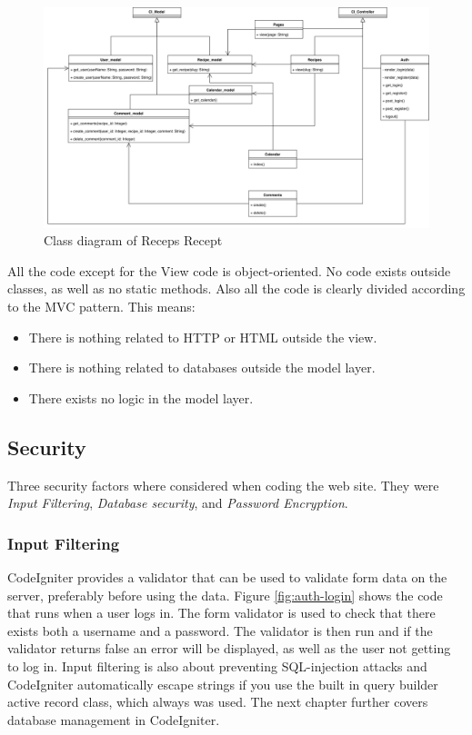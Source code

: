 \documentclass[a4paper]{scrartcl}
\begin{document}
\begin{figure}
	\begin{center}
		\includegraphics[width=\linewidth]{images/class-diagram.jpg}
		\caption{Class diagram of Receps Recept}
		\label{fig:class-diagram}
	\end{center}
\end{figure}

All the code except for the View code is object-oriented. No code exists outside classes, as well as no static methods. Also all the code is clearly divided according to the MVC pattern. This means:
\begin{itemize}
	\item There is nothing related to HTTP or HTML outside the view.
	\item There is nothing related to databases outside the model layer.
	\item There exists no logic in the model layer.
\end{itemize}

\subsection{Security}
Three security factors where considered when coding the web site. They were \textit{Input Filtering}, \textit{Database security}, and \textit{Password Encryption}.

\subsubsection{Input Filtering}
CodeIgniter provides a validator that can be used to validate form data on the server, preferably before using the data. Figure \ref{fig:auth-login} shows the code that runs when a user logs in. The form validator is used to check that there exists both a username and a password. The validator is then run and if the validator returns false an error will be displayed, as well as the user not getting to log in. Input filtering is also about preventing SQL-injection attacks and CodeIgniter automatically escape strings if you use the built in query builder active record class, which always was used. The next chapter further covers database management in CodeIgniter.
\end{document}
